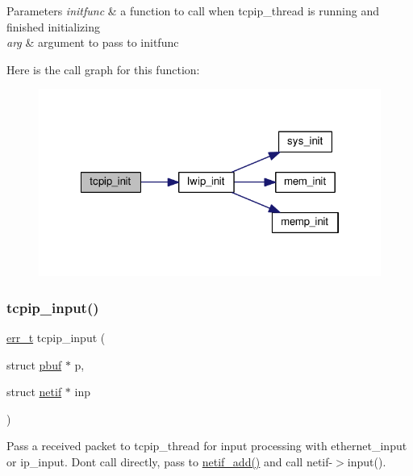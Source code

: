 \begin{DoxyParams}{Parameters}
{\em initfunc} & a function to call when tcpip\+\_\+thread is running and finished initializing \\
\hline
{\em arg} & argument to pass to initfunc \\
\hline
\end{DoxyParams}
Here is the call graph for this function\+:
\nopagebreak
\begin{figure}[H]
\begin{center}
\leavevmode
\includegraphics[width=322pt]{group__lwip__os_ga1f3a88b8df6ba3b9ed1c00e0a305e3db_cgraph}
\end{center}
\end{figure}
\mbox{\label{group__lwip__os_gae510f195171bed8499ae94e264a92717}} 
\subsubsection{\texorpdfstring{tcpip\+\_\+input()}{tcpip\_input()}}
{\footnotesize\ttfamily \hyperlink{group__infrastructure__errors_gaf02d9da80fd66b4f986d2c53d7231ddb}{err\+\_\+t} tcpip\+\_\+input (\begin{DoxyParamCaption}\item[{struct \hyperlink{structpbuf}{pbuf} $\ast$}]{p,  }\item[{struct \hyperlink{structnetif}{netif} $\ast$}]{inp }\end{DoxyParamCaption})}

Pass a received packet to tcpip\+\_\+thread for input processing with ethernet\+\_\+input or ip\+\_\+input. Don\textquotesingle{}t call directly, pass to \hyperlink{group__netif_gabde72af134ae7047a46ad7719d2a1ee9}{netif\+\_\+add()} and call netif-\/$>$input().


